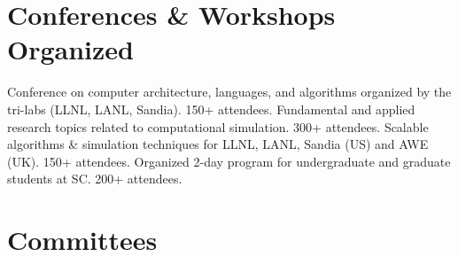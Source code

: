 


\section{Conferences \& Workshops Organized}
		{Conference on computer architecture, languages, and algorithms organized by the tri-labs (LLNL, LANL, Sandia). 150+ attendees.}
		{%
		Fundamental and applied research topics related to %
		computational simulation. 300+ attendees.}
		{Scalable algorithms \& simulation techniques for LLNL, LANL, Sandia (US) and AWE (UK). 150+ attendees.}
		{Organized 2-day program for undergraduate and graduate students at SC. 200+ attendees.}


\section{Committees}



